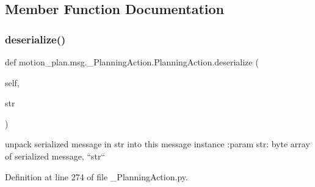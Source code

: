 \subsection{Member Function Documentation}
\mbox{\label{classmotion__plan_1_1msg_1_1__PlanningAction_1_1PlanningAction_aca61d36fc92b5b569aea5932fdbe8265}} 
\subsubsection{\texorpdfstring{deserialize()}{deserialize()}}
{\footnotesize\ttfamily def motion\+\_\+plan.\+msg.\+\_\+\+Planning\+Action.\+Planning\+Action.\+deserialize (\begin{DoxyParamCaption}\item[{}]{self,  }\item[{}]{str }\end{DoxyParamCaption})}

\begin{DoxyVerb}unpack serialized message in str into this message instance
:param str: byte array of serialized message, ``str``
\end{DoxyVerb}
 

Definition at line 274 of file \+\_\+\+Planning\+Action.\+py.


